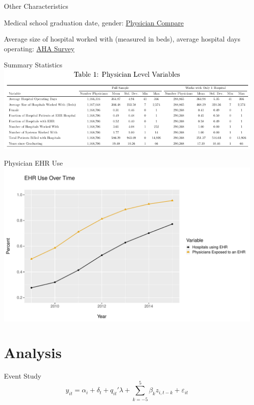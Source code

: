 \documentclass[10pt]{beamer}
\begin{document}
\begin{frame}{Other Characteristics}

Medical school graduation date, gender: \underline{Physician Compare}

\vspace{5mm}

Average size of hospital worked with (measured in beds), average hospital days operating: \underline{AHA Survey}
\end{frame}

\begin{frame}{Summary Statistics}
\centering
    \includegraphics[scale=.8]{Objects/sumstats.pdf}
\end{frame}

\begin{frame}{Physician EHR Use}
    \centering
    \includegraphics[scale=.5]{Objects/sum_stats_year.pdf}
\end{frame}


\section{Analysis}

\begin{frame}{Event Study}
\begin{equation*}
    y_{it}=\alpha_i+\delta_t+q_{it}'\lambda+\sum_{k=-5}^5 \beta_kz_{i,t-k} + \varepsilon_{it}
\end{equation*}

    
\end{frame}
\end{document}
